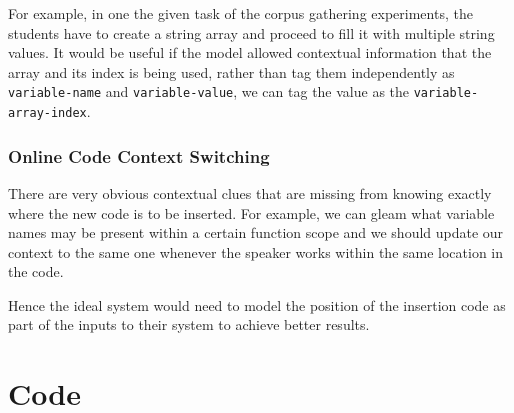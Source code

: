 \documentclass[fyp]{socreport}
\begin{document}
For example, in one the given task of the corpus gathering experiments, the
students have to create a string array and proceed to fill it with multiple
string values. It would be useful if the model allowed contextual information
that the array and its index is being used, rather than tag them independently
as \texttt{variable-name} and \texttt{variable-value}, we can tag the value as
the \texttt{variable-array-index}.


\subsection{Online Code Context Switching}
There are very obvious contextual clues that are missing from knowing exactly
where the new code is to be inserted. For example, we can gleam what variable
names may be present within a certain function scope and we should update our
context to the same one whenever the speaker works within the same location in
the code.

Hence the ideal system would need to model the position of the insertion
code as part of the inputs to their system to achieve better results.




\printbibliography[title={Whole bibliography}]

\appendix
\chapter{Code}
\end{document}
